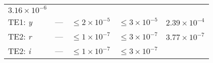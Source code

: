 \documentclass[DM,lsstdraft,toc]{lsstdoc}
\begin{document}
\begin{longtable}[]{@{}lllll@{}}
\begin{minipage}[t]{0.22\columnwidth}
\(3.16\times 10^{-6}\)\strut
\end{minipage}\tabularnewline
\begin{minipage}[t]{0.13\columnwidth}\raggedright\strut
TE1: \emph{y}\strut
\end{minipage} & \begin{minipage}[t]{0.05\columnwidth}\raggedright\strut
---\strut
\end{minipage} & \begin{minipage}[t]{0.24\columnwidth}\raggedright\strut
\(\leq 2\times 10^{-5}\)\strut
\end{minipage} & \begin{minipage}[t]{0.21\columnwidth}\raggedright\strut
\(\leq 3\times 10^{-5}\)\strut
\end{minipage} & \begin{minipage}[t]{0.22\columnwidth}\raggedright\strut
\(2.39\times 10^{-4}\)\strut
\end{minipage}\tabularnewline
\begin{minipage}[t]{0.13\columnwidth}\raggedright\strut
TE2: \emph{r}\strut
\end{minipage} & \begin{minipage}[t]{0.05\columnwidth}\raggedright\strut
---\strut
\end{minipage} & \begin{minipage}[t]{0.24\columnwidth}\raggedright\strut
\(\leq 1\times 10^{-7}\)\strut
\end{minipage} & \begin{minipage}[t]{0.21\columnwidth}\raggedright\strut
\(\leq 3\times 10^{-7}\)\strut
\end{minipage} & \begin{minipage}[t]{0.22\columnwidth}\raggedright\strut
\(3.77\times 10^{-7}\)\strut
\end{minipage}\tabularnewline
\begin{minipage}[t]{0.13\columnwidth}\raggedright\strut
TE2: \emph{i}\strut
\end{minipage} & \begin{minipage}[t]{0.05\columnwidth}\raggedright\strut
---\strut
\end{minipage} & \begin{minipage}[t]{0.24\columnwidth}\raggedright\strut
\(\leq 1\times 10^{-7}\)\strut
\end{minipage} & \begin{minipage}[t]{0.21\columnwidth}\raggedright\strut
\(\leq 3\times 10^{-7}\)\strut
\end{minipage} & \begin{minipage}[t]{0.22\columnwidth}\raggedright\strut

\end{minipage}
\end{longtable}
\end{document}
